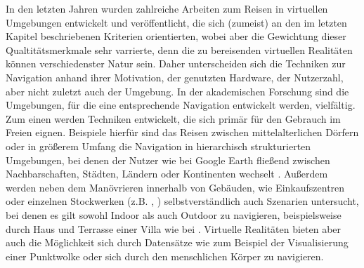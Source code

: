 In den letzten Jahren wurden zahlreiche Arbeiten zum Reisen in virtuellen Umgebungen entwickelt und veröffentlicht, die sich (zumeist) an den im letzten Kapitel beschriebenen Kriterien orientierten, wobei aber die Gewichtung dieser Qualtitätsmerkmale sehr varrierte, denn die zu bereisenden virtuellen Realitäten können verschiedenster Natur sein. Daher unterscheiden sich die Techniken zur Navigation anhand ihrer Motivation, der genutzten Hardware, der Nutzerzahl, aber nicht zuletzt auch der Umgebung.
In der akademischen Forschung sind die Umgebungen, für die eine entsprechende Navigation entwickelt werden, vielfältig.
Zum einen werden Techniken entwickelt, die sich primär für den Gebrauch im Freien eignen. Beispiele hierfür sind das Reisen zwischen mittelalterlichen Dörfern \cite{Krekhov2018GulliVR} oder in größerem Umfang die Navigation in hierarchisch strukturierten Umgebungen, bei denen der Nutzer wie bei Google Earth fließend zwischen Nachbarschaften, Städten, Ländern oder Kontinenten wechselt \cite{pierce_representations}.
Außerdem werden neben dem Manövrieren innerhalb von Gebäuden, wie Einkaufszentren oder einzelnen Stockwerken (z.B. \cite{Richardson1999SpatialEnvironments}, \cite{Liang2018EvaluatingEnvironments}) selbstverständlich auch Szenarien untersucht, bei denen es gilt sowohl Indoor als auch Outdoor zu navigieren, beispielsweise durch Haus und Terrasse einer Villa wie bei \cite{Dallat2018Giant}. 
Virtuelle Realitäten bieten aber auch die Möglichkeit sich durch Datensätze wie zum Beispiel der Visualisierung einer Punktwolke oder sich durch den menschlichen Körper \cite{Kopper2006DesignEnvironments} zu navigieren.

